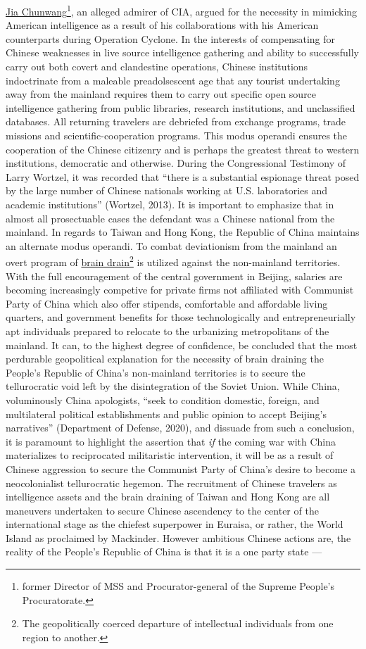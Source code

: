 \documentclass[12pt]{article}
\begin{document}
\underline{Jia Chunwang}\footnote{former Director of MSS and Procurator-general of the Supreme People's Procuratorate.}, an alleged admirer of CIA, argued for the necessity in mimicking American intelligence as a result of his collaborations with his American counterparts during Operation Cyclone. In the interests of compensating for Chinese weaknesses in live source intelligence gathering and ability to successfully carry out both covert and clandestine operations, Chinese institutions indoctrinate from a maleable preadolsescent age that any tourist undertaking away from the mainland requires them to carry out specific open source intelligence gathering from public libraries, research institutions, and unclassified databases. All returning travelers are debriefed from exchange programs, trade missions and scientific-cooperation programs. This modus operandi ensures the cooperation of the Chinese citizenry and is perhaps the greatest threat to western institutions, democratic and otherwise. During the Congressional Testimony of Larry Wortzel, it was recorded that “there is a substantial espionage threat posed by the large number of Chinese nationals working at U.S. laboratories and academic institutions”  (Wortzel, 2013). It is important to emphasize that in almost all prosectuable cases the defendant was a Chinese national from the mainland. In regards to Taiwan and Hong Kong, the Republic of China maintains an alternate modus operandi. To combat deviationism from the mainland an overt program of \underline{brain drain}\footnote{The geopolitically coerced departure of intellectual individuals from one region to another.} is utilized against the non-mainland territories. With the full encouragement of the central government in Beijing, salaries are becoming increasingly competive for private firms not affiliated with Communist Party of China which also offer stipends, comfortable and affordable living quarters, and government benefits for those technologically and entrepreneurially apt individuals prepared to relocate to the urbanizing metropolitans of the mainland. It can, to the highest degree of confidence, be concluded that the most perdurable geopolitical explanation for the necessity of brain draining the People's Republic of China's non-mainland territories is to secure the tellurocratic void left by the disintegration of the Soviet Union. While China, voluminously China apologists, “seek to condition domestic, foreign, and multilateral political establishments and public opinion to accept Beijing's narratives” (Department of Defense, 2020), and dissuade from such a conclusion, it is paramount to highlight the assertion that \emph{if} the coming war with China materializes to reciprocated militaristic intervention, it will be as a result of Chinese aggression to secure the Communist Party of China's desire to become a neocolonialist tellurocratic hegemon. The recruitment of Chinese travelers as intelligence assets and the brain draining of Taiwan and Hong Kong are all maneuvers undertaken to secure Chinese ascendency to the center of the international stage as the chiefest superpower in Euraisa, or rather, the World Island as proclaimed by Mackinder. However ambitious Chinese actions are, the reality of the People's Republic of China is that it is a one party state — 
\end{document}
